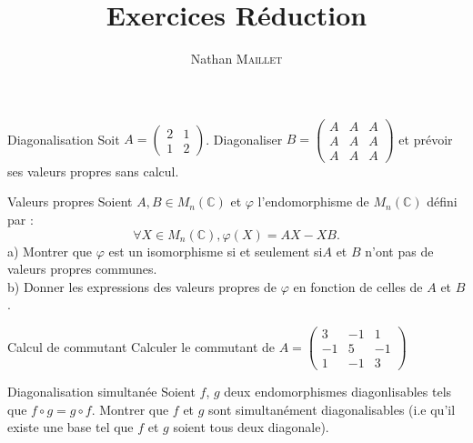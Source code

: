 \documentclass[french, a4paper, 11pt]{article}
\title{Exercices Réduction}
\author{Nathan \textsc{Maillet}}
\date{}
\newcommand{\ssi}{si et seulement si\xspace}		%
\newcommand{\C}{\mathbb{C}}   %
\begin{document}
\maketitle
\begin{cadre}{Diagonalisation}
    Soit \(A=\begin{pmatrix} 2 & 1 \\ 1 & 2 \end{pmatrix}\). Diagonaliser \(B=\begin{pmatrix}
        A & A & A \\
        A & A & A \\
        A & A & A
    \end{pmatrix}\) et prévoir ses valeurs propres sans calcul.
\end{cadre}

\begin{cadre}{Valeurs propres}
    Soient \(A,B \in M_n(\C)\) et \(\varphi\) l'endomorphisme de \(M_n(\C)\) défini par : 
        \[\forall X \in M_n(\C), \varphi(X)=AX-XB.\]
    a) Montrer que $\varphi$ est un isomorphisme \ssi $A$ et $B$ n'ont pas de valeurs propres communes.\\
    b) Donner les expressions des valeurs propres de $\varphi$ en fonction de celles de $A$ et $B$.
\end{cadre}

\begin{cadre}{Calcul de commutant}
    Calculer le commutant de \(A=\begin{pmatrix}
        3 & -1 & 1\\
        -1 & 5 & -1\\
        1 & -1 & 3
    \end{pmatrix}\)
\end{cadre}
 
\begin{cadre}{Diagonalisation simultanée}
    Soient \(f\), \(g\) deux endomorphismes diagonlisables tels que \(f\circ g=g\circ f\). Montrer que \(f\) et \(g\) sont simultanément diagonalisables (i.e qu'il existe une base tel que \(f\) et \(g\) soient tous deux diagonale).
    
\end{cadre}
\end{document}
